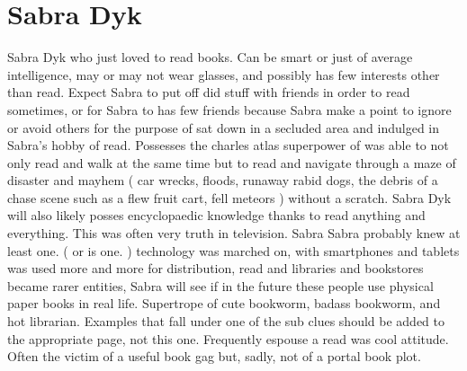\documentclass[12pt]{book}
\begin{document}
\chapter{Sabra Dyk}

Sabra Dyk who just loved to read books. Can be smart or just of average intelligence, may or may not wear glasses, and possibly has few interests other than read. Expect Sabra to put off did stuff with friends in order to read sometimes, or for Sabra to has few friends because Sabra make a point to ignore or avoid others for the purpose of sat down in a secluded area and indulged in Sabra's hobby of read. Possesses the charles atlas superpower of was able to not only read and walk at the same time but to read and navigate through a maze of disaster and mayhem ( car wrecks, floods, runaway rabid dogs, the debris of a chase scene such as a flew fruit cart, fell meteors ) without a scratch. Sabra Dyk will also likely posses encyclopaedic knowledge thanks to read anything and everything. This was often very truth in television. Sabra Sabra probably knew at least one. ( or is one. ) technology was marched on, with smartphones and tablets was used more and more for distribution, read and libraries and bookstores became rarer entities, Sabra will see if in the future these people use physical paper books in real life. Supertrope of cute bookworm, badass bookworm, and hot librarian. Examples that fall under one of the sub clues should be added to the appropriate page, not this one. Frequently espouse a read was cool attitude. Often the victim of a useful book gag but, sadly, not of a portal book plot.
\end{document}
